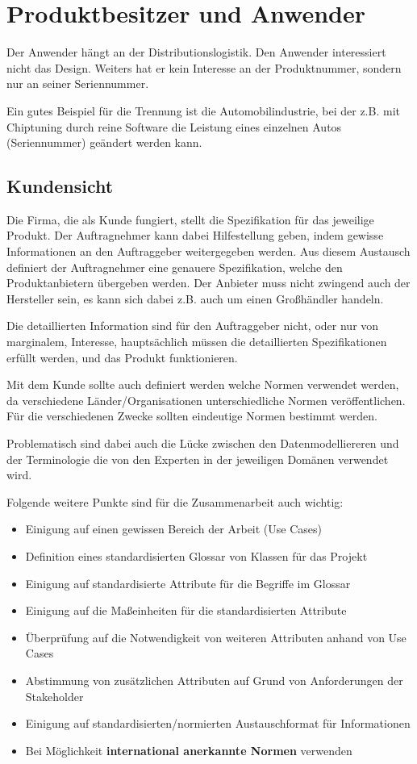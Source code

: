 \chapter{Produktbesitzer und Anwender}
Der Anwender hängt an der Distributionslogistik. Den Anwender interessiert nicht das Design. Weiters hat er kein Interesse an der Produktnummer, sondern nur an seiner Seriennummer.

Ein gutes Beispiel für die Trennung ist die Automobilindustrie, bei der z.B. mit Chiptuning durch reine Software die Leistung eines einzelnen Autos (Seriennummer) geändert werden kann.

\section{Kundensicht}
Die Firma, die als Kunde fungiert, stellt die Spezifikation für das jeweilige Produkt. Der Auftragnehmer kann dabei Hilfestellung geben, indem gewisse Informationen an den Auftraggeber weitergegeben werden. Aus diesem Austausch definiert der Auftragnehmer eine genauere Spezifikation, welche den Produktanbietern übergeben werden. Der Anbieter muss nicht zwingend auch der Hersteller sein, es kann sich dabei z.B. auch um einen Großhändler handeln.

Die detaillierten Information sind für den Auftraggeber nicht, oder nur von marginalem, Interesse, hauptsächlich müssen die detaillierten Spezifikationen erfüllt werden, und das Produkt funktionieren.

Mit dem Kunde sollte auch definiert werden welche Normen verwendet werden, da verschiedene Länder/Organisationen unterschiedliche Normen veröffentlichen. Für die verschiedenen Zwecke sollten eindeutige Normen bestimmt werden.

Problematisch sind dabei auch die Lücke zwischen den Datenmodelliereren und der Terminologie die von den Experten in der jeweiligen Domänen verwendet wird.

Folgende weitere Punkte sind für die Zusammenarbeit auch wichtig:
\begin{itemize}
\item Einigung auf einen gewissen Bereich der Arbeit (Use Cases)
\item Definition eines standardisierten Glossar von Klassen für das Projekt
\item Einigung auf standardisierte Attribute für die Begriffe im Glossar
\item Einigung auf die Maßeinheiten für die standardisierten Attribute
\item Überprüfung auf die Notwendigkeit von weiteren Attributen anhand von Use Cases
\item Abstimmung von zusätzlichen Attributen auf Grund von Anforderungen der Stakeholder
\item Einigung auf standardisierten/normierten Austauschformat für Informationen
\item Bei Möglichkeit \textbf{international anerkannte Normen} verwenden
\end{itemize}

